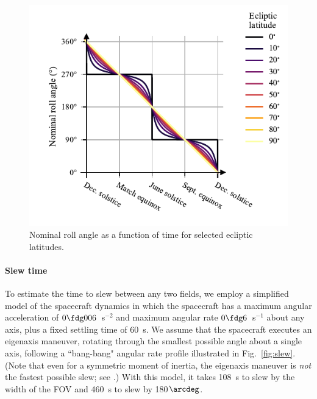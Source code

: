 \documentclass[twocolumn,times]{aastex631}
\begin{document}
\begin{figure}
    \includegraphics[width=\columnwidth]{figures/nominal-roll}
    \caption{\label{fig:nominal-roll}Nominal roll angle as a function of time for selected ecliptic latitudes.}
\end{figure}

\paragraph{Slew time}
To estimate the time to slew between any two fields, we employ a simplified model of the spacecraft dynamics in which the spacecraft has a maximum angular acceleration of $0 \fdg 006$~s$^{-2}$ and maximum angular rate $0 \fdg 6$~s$^{-1}$ about any axis, plus a fixed settling time of 60~s. We assume that the spacecraft executes an eigenaxis maneuver, rotating through the smallest possible angle about a single axis, following a ``bang-bang" angular rate profile illustrated in Fig.~\ref{fig:slew}. (Note that even for a symmetric moment of inertia, the eigenaxis maneuver is \emph{not} the fastest possible slew; see \citealt{1993JGCD...16..446B}.) With this model, it takes 108~s to slew by the width of the \ac{FOV} and 460~s to slew by 180$\arcdeg$.
\end{document}
